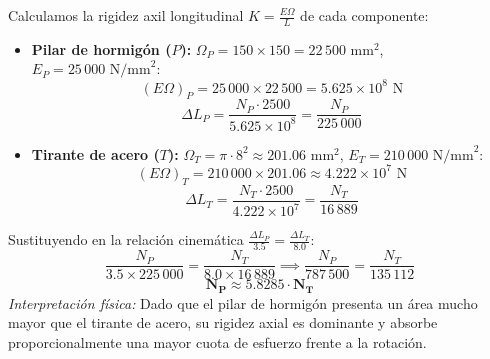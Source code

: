 {    

    Calculamos la rigidez axil longitudinal $K = \frac{E \Omega}{L}$ de cada componente:
    \begin{itemize}
        \item \textbf{Pilar de hormigón ($P$):} $\Omega_P = 150 \times 150 = 22\,500\text{ mm}^2$, $E_P = 25\,000\text{ N/mm}^2$:
              \begin{equation}
                  (E\Omega)_P = 25\,000 \times 22\,500 = 5.625 \times 10^8\text{ N}
              \end{equation}
              \begin{equation}
                  \Delta L_P = \frac{N_P \cdot 2500}{5.625 \times 10^8} = \frac{N_P}{225\,000}
              \end{equation}
        \item \textbf{Tirante de acero ($T$):} $\Omega_T = \pi \cdot 8^2 \approx 201.06\text{ mm}^2$, $E_T = 210\,000\text{ N/mm}^2$:
              \begin{equation}
                  (E\Omega)_T = 210\,000 \times 201.06 \approx 4.222 \times 10^7\text{ N}
              \end{equation}
              \begin{equation}
                  \Delta L_T = \frac{N_T \cdot 2500}{4.222 \times 10^7} = \frac{N_T}{16\,889}
              \end{equation}
    \end{itemize}
    Sustituyendo en la relación cinemática $\frac{\Delta L_P}{3.5} = \frac{\Delta L_T}{8.0}$:
    \begin{equation}
        \frac{N_P}{3.5 \times 225\,000} = \frac{N_T}{8.0 \times 16\,889} \implies \frac{N_P}{787\,500} = \frac{N_T}{135\,112}
    \end{equation}
    \begin{equation}
        \mathbf{N_P \approx 5.8285 \cdot N_T}
    \end{equation}
    \textit{Interpretación física:} Dado que el pilar de hormigón presenta un área mucho mayor que el tirante de acero, su rigidez axial es dominante y absorbe proporcionalmente una mayor cuota de esfuerzo frente a la rotación.


}
